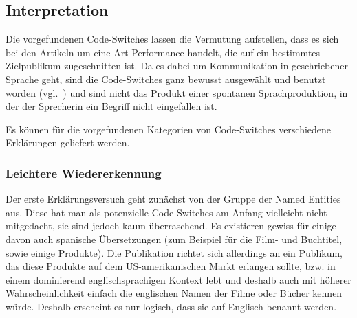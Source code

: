 \begin{comment}
\begin{enumerate}
  \item English interjections as part of the Spanish text:
      ``me di quenta que wow!'', ``pense wow esto es lo que quiro''
  \item Whole phrases in English, not necessarily idiomatic %
  \item Misc: one English word without category at the moment
  \item Cool/slang/hip/life-style
      ``cool''
  \item Personal descriptions
      needy, creepy, charming
  \item Berufe/Stellenbezeichnungen: ``nanny'', ``babysitter'', ``dog walker'', ``coach de lifestyle''
  \item Electrodomestics
      ``juicer'' (in Klammern, next to the spanisch text), ``microwave''
\end{enumerate}
\end{comment}

\subsection{Interpretation}
\label{chap:results-analysis}

Die vorgefundenen Code-Switches lassen die Vermutung aufstellen, dass es sich bei den Artikeln um eine Art Performance handelt, die auf ein bestimmtes Zielpublikum zugeschnitten ist.
Da es dabei um Kommunikation in geschriebener Sprache geht, sind die Code-Switches ganz bewusst ausgewählt und benutzt worden (vgl.~\cite{Mahootian05}) und sind nicht das Produkt einer spontanen Sprachproduktion, in der der Sprecherin ein Begriff nicht eingefallen ist.

Es können für die vorgefundenen Kategorien von Code-Switches verschiedene Erklärungen geliefert werden.

\subsubsection{Leichtere Wiedererkennung}
Der erste Erklärungsversuch geht zunächst von der Gruppe der Named Entities aus.
Diese hat man als potenzielle Code-Switches am Anfang vielleicht nicht mitgedacht, sie sind jedoch kaum überraschend.
Es existieren gewiss für einige davon auch spanische Übersetzungen (zum Beispiel für die Film- und Buchtitel, sowie einige Produkte).
Die Publikation richtet sich allerdings an ein Publikum, das diese Produkte auf dem US-amerikanischen Markt erlangen sollte, bzw. in einem dominierend englischsprachigen Kontext lebt und deshalb auch mit höherer Wahrscheinlichkeit einfach die englischen Namen der Filme oder Bücher kennen würde.
Deshalb erscheint es nur logisch, dass sie auf Englisch benannt werden.

